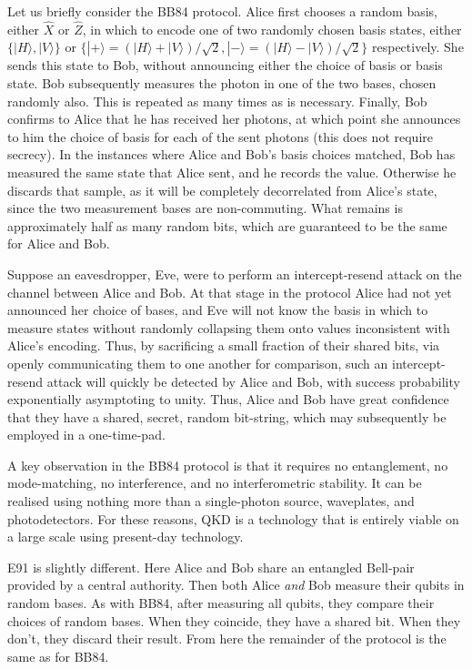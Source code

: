 \documentclass[aps,rmp,twocolumn,amsmath,amssymb,nofootinbib,superscriptaddress,longbibliography,floatfix]{revtex4-1}
\newcommand{\ket}[1]{|#1\rangle}
\begin{document}
Let us briefly consider the BB84 protocol. Alice first chooses a random basis, either $\hat{X}$ or $\hat{Z}$, in which to encode one of two randomly chosen basis states, either \mbox{$\{\ket{H},\ket{V}\}$} or \mbox{$\{\ket{+}=(\ket{H}+\ket{V})/\sqrt{2},\ket{-}=(\ket{H}-\ket{V})/\sqrt{2}\}$} respectively. She sends this state to Bob, without announcing either the choice of basis or basis state. Bob subsequently measures the photon in one of the two bases, chosen randomly also. This is repeated as many times as is necessary. Finally, Bob confirms to Alice that he has received her photons, at which point she announces to him the choice of basis for each of the sent photons (this does not require secrecy). In the instances where Alice and Bob's basis choices matched, Bob has measured the same state that Alice sent, and he records the value. Otherwise he discards that sample, as it will be completely decorrelated from Alice's state, since the two measurement bases are non-commuting. What remains is approximately half as many random bits, which are guaranteed to be the same for Alice and Bob.

Suppose an eavesdropper, Eve, were to perform an intercept-resend attack on the channel between Alice and Bob. At that stage in the protocol Alice had not yet announced her choice of bases, and Eve will not know the basis in which to measure states without randomly collapsing them onto values inconsistent with Alice's encoding. Thus, by sacrificing a small fraction of their shared bits, via openly communicating them to one another for comparison, such an intercept-resend attack will quickly be detected by Alice and Bob, with success probability exponentially asymptoting to unity. Thus, Alice and Bob have great confidence that they have a shared, secret, random bit-string, which may subsequently be employed in a one-time-pad.

A key observation in the BB84 protocol is that it requires no entanglement, no mode-matching, no interference, and no interferometric stability. It can be realised using nothing more than a single-photon source, waveplates, and photodetectors. For these reasons, QKD is a technology that is entirely viable on a large scale using present-day technology.

E91 is slightly different. Here Alice and Bob share an entangled Bell-pair provided by a central authority. Then both Alice \emph{and} Bob measure their qubits in random bases. As with BB84, after measuring all qubits, they compare their choices of random bases. When they coincide, they have a shared bit. When they don't, they discard their result. From here the remainder of the protocol is the same as for BB84.
\end{document}
